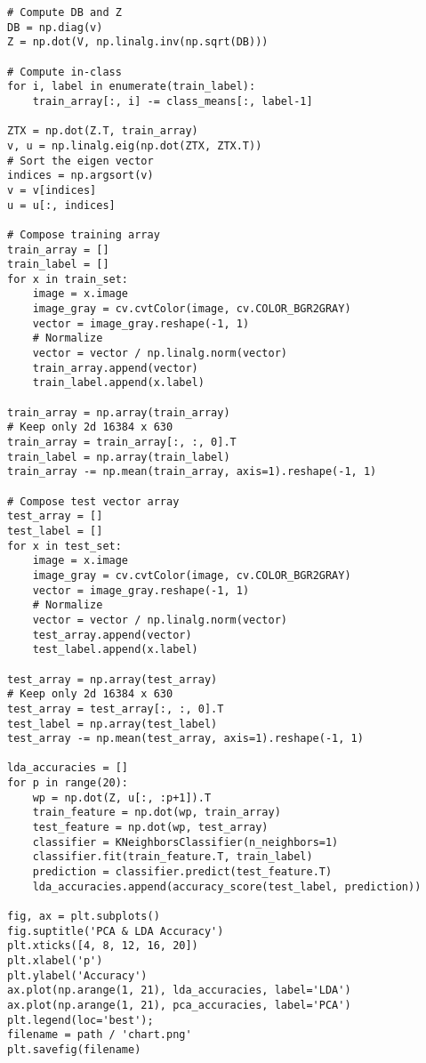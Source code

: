 \documentclass[11pt]{article}
\begin{document}
\begin{lstlisting}
# Compute DB and Z
DB = np.diag(v)
Z = np.dot(V, np.linalg.inv(np.sqrt(DB)))

# Compute in-class 
for i, label in enumerate(train_label):
    train_array[:, i] -= class_means[:, label-1]

ZTX = np.dot(Z.T, train_array)
v, u = np.linalg.eig(np.dot(ZTX, ZTX.T))
# Sort the eigen vector
indices = np.argsort(v)
v = v[indices]
u = u[:, indices]

# Compose training array
train_array = []
train_label = []
for x in train_set:
    image = x.image
    image_gray = cv.cvtColor(image, cv.COLOR_BGR2GRAY)
    vector = image_gray.reshape(-1, 1)
    # Normalize
    vector = vector / np.linalg.norm(vector)
    train_array.append(vector)
    train_label.append(x.label)
    
train_array = np.array(train_array)
# Keep only 2d 16384 x 630
train_array = train_array[:, :, 0].T
train_label = np.array(train_label)
train_array -= np.mean(train_array, axis=1).reshape(-1, 1)

# Compose test vector array
test_array = []
test_label = []
for x in test_set:
    image = x.image
    image_gray = cv.cvtColor(image, cv.COLOR_BGR2GRAY)
    vector = image_gray.reshape(-1, 1)
    # Normalize
    vector = vector / np.linalg.norm(vector)
    test_array.append(vector)
    test_label.append(x.label)
    
test_array = np.array(test_array)
# Keep only 2d 16384 x 630
test_array = test_array[:, :, 0].T
test_label = np.array(test_label)
test_array -= np.mean(test_array, axis=1).reshape(-1, 1)

lda_accuracies = []
for p in range(20):
    wp = np.dot(Z, u[:, :p+1]).T
    train_feature = np.dot(wp, train_array)
    test_feature = np.dot(wp, test_array)
    classifier = KNeighborsClassifier(n_neighbors=1)
    classifier.fit(train_feature.T, train_label)
    prediction = classifier.predict(test_feature.T)
    lda_accuracies.append(accuracy_score(test_label, prediction))

fig, ax = plt.subplots()
fig.suptitle('PCA & LDA Accuracy')
plt.xticks([4, 8, 12, 16, 20])
plt.xlabel('p')
plt.ylabel('Accuracy')
ax.plot(np.arange(1, 21), lda_accuracies, label='LDA')
ax.plot(np.arange(1, 21), pca_accuracies, label='PCA')
plt.legend(loc='best');
filename = path / 'chart.png'
plt.savefig(filename)

\end{lstlisting}


\end{document}
